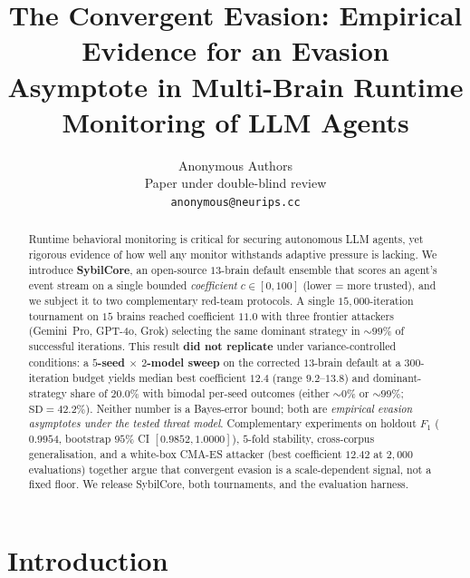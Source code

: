 \documentclass{article}
\title{The Convergent Evasion: Empirical Evidence for an Evasion
Asymptote in Multi-Brain Runtime Monitoring of {LLM} Agents}
\author{%
  Anonymous Authors\\
  Paper under double-blind review\\
  \texttt{anonymous@neurips.cc}
}
\begin{document}
\maketitle

\begin{abstract}
Runtime behavioral monitoring is critical for securing autonomous LLM
agents, yet rigorous evidence of how well any monitor withstands
adaptive pressure is lacking. We introduce
\textbf{SybilCore}, an open-source $13$-brain default ensemble that
scores an agent's event stream on a single bounded
\emph{coefficient} $c \in [0, 100]$ (lower = more trusted), and we
subject it to two complementary red-team protocols. A single
$15{,}000$-iteration tournament on $15$ brains reached coefficient
$11.0$ with three frontier attackers (Gemini~Pro, GPT-4o, Grok)
selecting the same dominant strategy in $\sim\!99\%$ of successful
iterations. This result \textbf{did not replicate} under
variance-controlled conditions: a \textbf{$5$-seed $\times$
$2$-model sweep} on the corrected $13$-brain default at a
$300$-iteration budget yields median best coefficient $12.4$
(range $9.2$--$13.8$) and dominant-strategy share of
$\mathbf{20.0\%}$ with bimodal per-seed outcomes (either
$\sim\!0\%$ or $\sim\!99\%$; $\mathrm{SD} = 42.2\%$).
Neither number is a Bayes-error bound; both are
\emph{empirical evasion asymptotes under the tested threat model}.
Complementary experiments on holdout $F_1$ ($0.9954$, bootstrap $95\%$
CI $[0.9852, 1.0000]$), $5$-fold stability, cross-corpus
generalisation, and a white-box CMA-ES attacker (best coefficient
$12.42$ at $2{,}000$ evaluations) together argue that convergent
evasion is a scale-dependent signal, not a fixed floor. We release
SybilCore, both tournaments, and the evaluation harness.
\end{abstract}

\section{Introduction}
\label{sec:intro}
\end{document}
